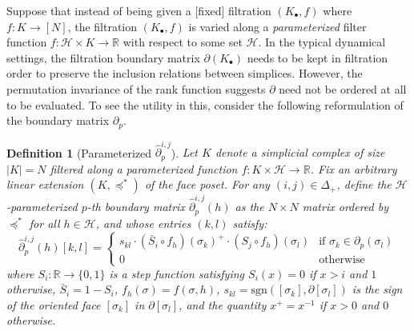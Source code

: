 \documentclass[12pt]{article}
\numberwithin{equation}{section}
\newcommand{\+}{%
	\raisebox{0.18ex}{\scaleobj{0.55}{+}}
}
\newtheorem{definition}{Definition}
\theoremstyle{definition}
\begin{document}
Suppose that instead of being given a [fixed] filtration $(K_\bullet, f)$ where $f: K \to [N]$, the filtration $(K_\bullet, f)$ is varied along a \emph{parameterized} filter function $f : \mathcal{H} \times K \to \mathbb{R}$ with respect to some set $\mathcal{H}$.
In the typical dynamical settings, the filtration boundary matrix $\partial(K_\bullet)$ needs to be kept in filtration order to preserve the inclusion relations between simplices.
However, the permutation invariance of the rank function suggests $\partial$ need not be ordered at all to be evaluated. 
To see the utility in this, consider the following reformulation of the boundary matrix $\partial_p$. 
\begin{definition}[Parameterized $\hat{\partial}_p^{i,j}$]\label{def:time_boundary_matrix}
Let $K$ denote a simplicial complex of size $\lvert K \rvert = N$ filtered along a parameterized function $f : K \times \mathcal{H} \to \mathbb{R}$. Fix an arbitrary linear extension $(K, \preceq^\ast)$ of the face poset. For any $(i,j) \in \Delta_{+}$, define the $\mathcal{H}$-\emph{parameterized} $p$\emph{-th boundary matrix} $\hat{\partial}_p^{i, j}(h)$ as the $N \times N$ matrix ordered by $\preceq^\ast$ for all $h \in \mathcal{H}$, and whose entries $(k,l)$ satisfy:
\begin{equation}\label{eq:param_boundary_matrix}
	\hat{\partial}_p^{i,j}(h)[k,l] = \begin{cases}
	s_{kl} \cdot (\bar{S}_{i} \circ f_h)(\sigma_k)^+ \cdot (S_{j} \circ f_h)(\sigma_l) & \text{if } \sigma_k \in \partial_p(\sigma_l)\\
	0 & \text{otherwise}
\end{cases}
\end{equation}
where $S_{i} : \mathbb{R} \to \{0, 1\}$ is a \emph{step} function satisfying $S_i(x) = 0$ if $x > i$ and $1$ otherwise, $\bar{S}_{i} = 1 - S_i$, $f_h(\sigma) = f(\sigma, h)$, $s_{kl} = \mathrm{sgn}([\sigma_k], \partial [\sigma_l])$ is the sign of the oriented face $[\sigma_k]$ in $\partial[\sigma_l]$, and the quantity $x^{+} = x^{-1}$ if $x > 0$ and $0$ otherwise.
\end{definition}
\end{document}
